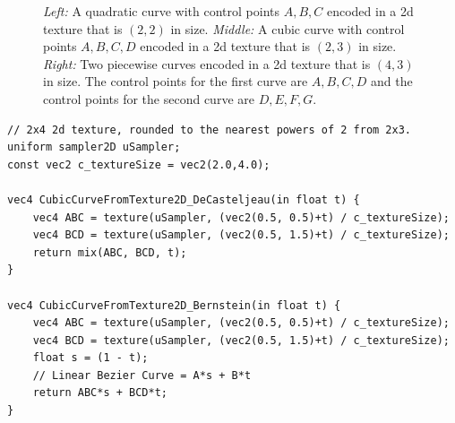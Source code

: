 \documentclass{jcgt}
\begin{document}
  \begin{figure}
    \hspace{5mm}  
    \hspace{5mm}
    \caption{\textit{Left:} A quadratic curve with control points $A,B,C$ encoded in a 2d texture that is $(2,2)$ in size. \textit{Middle:} A cubic curve with control points $A,B,C,D$ encoded in a 2d texture that is $(2,3)$ in size.  \textit{Right:} Two piecewise curves encoded in a 2d texture that is $(4,3)$ in size.  The control points for the first curve are $A,B,C,D$ and the control points for the second curve are $D,E,F,G$.} 
    \label{fig:texlayeout2d}
  \end{figure}  

\begin{lstlisting}[caption={GLSL for evaluating a cubic curve encoded in a $(2,4)$ pixel 2d texture.  Bilinear texture sampling used to evaluate the first two levesl of the De Casteljeau algorithm, then the process is continued both with the De Casteljeau algorithm, as well as the Bernstein form of a linear Bezier curve (lerp).}, label={lst:GLSLCubicTexture2D}]
// 2x4 2d texture, rounded to the nearest powers of 2 from 2x3.
uniform sampler2D uSampler; 
const vec2 c_textureSize = vec2(2.0,4.0);

vec4 CubicCurveFromTexture2D_DeCasteljeau(in float t) {
    vec4 ABC = texture(uSampler, (vec2(0.5, 0.5)+t) / c_textureSize);
    vec4 BCD = texture(uSampler, (vec2(0.5, 1.5)+t) / c_textureSize);
    return mix(ABC, BCD, t);
}

vec4 CubicCurveFromTexture2D_Bernstein(in float t) {
    vec4 ABC = texture(uSampler, (vec2(0.5, 0.5)+t) / c_textureSize);
    vec4 BCD = texture(uSampler, (vec2(0.5, 1.5)+t) / c_textureSize);
    float s = (1 - t);
    // Linear Bezier Curve = A*s + B*t
    return ABC*s + BCD*t;
}
\end{lstlisting}
\end{document}

